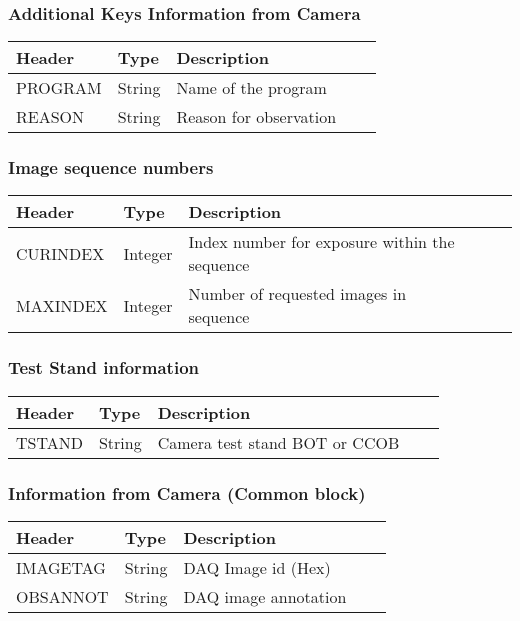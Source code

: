 \subsubsection{Additional Keys Information from Camera}
\begin{tabular}{l l l l l}

\hline
Header & Type & Description \\
\hline
PROGRAM & String & Name of the program \\
REASON & String & Reason for observation \\
\hline
\end{tabular}


\subsubsection{Image sequence numbers}
\begin{tabular}{l l l l l}

\hline
Header & Type & Description \\
\hline
CURINDEX & Integer & Index number for exposure within the sequence \\
MAXINDEX & Integer & Number of requested images in sequence \\
\hline
\end{tabular}


\subsubsection{Test Stand information}
\begin{tabular}{l l l l l}

\hline
Header & Type & Description \\
\hline
TSTAND & String & Camera test stand BOT or CCOB \\
\hline
\end{tabular}


\subsubsection{Information from Camera (Common block)}
\begin{tabular}{l l l l l}

\hline
Header & Type & Description \\
\hline
IMAGETAG & String & DAQ Image id (Hex) \\
OBSANNOT & String & DAQ image annotation \\
\hline
\end{tabular}


